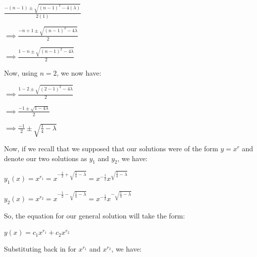 \documentclass[executivepaper]{article}
\begin{document}
\begin{center}

$\frac{-(n-1) \pm \sqrt{(n-1)^2-4(\lambda)}}{2(1)}$

\hspace{1mm}

$\implies \frac{-n+1 \pm \sqrt{(n-1)^2-4 \lambda}}{2}$

\hspace{1mm}

$\implies \frac{1-n \pm \sqrt{(n-1)^2-4 \lambda}}{2}$

\vspace{3mm}

Now, using $n=2$, we now have:

\vspace{2mm}

$\implies \frac{1-2 \pm \sqrt{(2-1)^2-4 \lambda}}{2}$

\hspace{1mm}

$\implies \frac{-1 \pm \sqrt{1-4 \lambda}}{2}$

\hspace{1mm}

$\implies \frac{-1}{2} \pm \sqrt{\frac{1}{4}-\lambda}$

\end{center}

Now, if we recall that we supposed that our solutions were of the form $y=x^r$ and denote our two solutions as $y_{1}$ and $y_{2}$, we have: 

\begin{center}

$y_{1}(x)=x^{r_{1}}=x^{-\frac{1}{2}+\sqrt{\frac{1}{4}-\lambda}}=x^{-\frac{1}{2}}x^{\sqrt{\frac{1}{4}-\lambda}}$

\hspace{1mm}

$y_{2}(x)=x^{r_{2}}=x^{-\frac{1}{2}-\sqrt{\frac{1}{4}-\lambda}}=x^{-\frac{1}{2}}x^{-\sqrt{\frac{1}{4}-\lambda}}$

\end{center}

So, the equation for our general solution will take the form:

\begin{center}

$y(x)=c_{1}x^{r_{1}}+c_{2}x^{r_{2}}$

\end{center}

Substituting back in for $x^{r_{1}}$ and $x^{r_{2}}$, we have:
\end{document}
